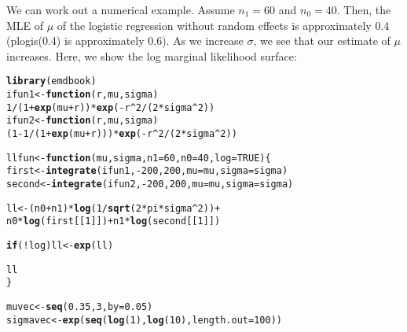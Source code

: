 \documentclass{article}\usepackage[]{graphicx}\usepackage[]{color}
\makeatletter
\newcommand{\hlnum}[1]{\textcolor[rgb]{0.686,0.059,0.569}{#1}}%
\newcommand{\hlopt}[1]{\textcolor[rgb]{0,0,0}{#1}}%
\newcommand{\hlstd}[1]{\textcolor[rgb]{0.345,0.345,0.345}{#1}}%
\newcommand{\hlkwa}[1]{\textcolor[rgb]{0.161,0.373,0.58}{\textbf{#1}}}%
\newcommand{\hlkwb}[1]{\textcolor[rgb]{0.69,0.353,0.396}{#1}}%
\newcommand{\hlkwc}[1]{\textcolor[rgb]{0.333,0.667,0.333}{#1}}%
\newcommand{\hlkwd}[1]{\textcolor[rgb]{0.737,0.353,0.396}{\textbf{#1}}}%
\newenvironment{kframe}{%
 \def\at@end@of@kframe{}%
 \ifinner\ifhmode%
  \def\at@end@of@kframe{\end{minipage}}%
  \begin{minipage}{\columnwidth}%
 \fi\fi%
 \def\FrameCommand##1{\hskip\@totalleftmargin \hskip-\fboxsep
 \colorbox{shadecolor}{##1}\hskip-\fboxsep
     \hskip-\linewidth \hskip-\@totalleftmargin \hskip\columnwidth}%
 \MakeFramed {\advance\hsize-\width
   \@totalleftmargin\z@ \linewidth\hsize
   \@setminipage}}%
 {\par\unskip\endMakeFramed%
 \at@end@of@kframe}
\newenvironment{knitrout}{}{} %
\makeatother
\begin{document}
We can work out a numerical example. Assume $n_1 = 60$ and $n_0=40$. Then, the MLE of $\mu$ of the logistic regression without random effects is approximately 0.4 (plogis(0.4) is approximately 0.6). As we increase $\sigma$, we see that our estimate of $\mu$ increases. Here, we show the log marginal likelihood surface:
\begin{knitrout}
\color{fgcolor}\begin{kframe}
\begin{alltt}
\hlkwd{library}\hlstd{(emdbook)}
\hlstd{ifun1} \hlkwb{<-} \hlkwa{function}\hlstd{(}\hlkwc{r}\hlstd{,} \hlkwc{mu}\hlstd{,} \hlkwc{sigma}\hlstd{)}
        \hlnum{1}\hlopt{/}\hlstd{(}\hlnum{1} \hlopt{+} \hlkwd{exp}\hlstd{(mu} \hlopt{+} \hlstd{r))} \hlopt{*} \hlkwd{exp}\hlstd{(}\hlopt{-}\hlstd{r}\hlopt{^}\hlnum{2}\hlopt{/}\hlstd{(}\hlnum{2} \hlopt{*} \hlstd{sigma}\hlopt{^}\hlnum{2}\hlstd{))}
\hlstd{ifun2} \hlkwb{<-} \hlkwa{function}\hlstd{(}\hlkwc{r}\hlstd{,} \hlkwc{mu}\hlstd{,} \hlkwc{sigma}\hlstd{)}
        \hlstd{(}\hlnum{1} \hlopt{-} \hlnum{1}\hlopt{/}\hlstd{(}\hlnum{1} \hlopt{+} \hlkwd{exp}\hlstd{(mu} \hlopt{+} \hlstd{r)))} \hlopt{*} \hlkwd{exp}\hlstd{(}\hlopt{-}\hlstd{r}\hlopt{^}\hlnum{2}\hlopt{/}\hlstd{(}\hlnum{2} \hlopt{*} \hlstd{sigma}\hlopt{^}\hlnum{2}\hlstd{))}

\hlstd{llfun} \hlkwb{<-} \hlkwa{function}\hlstd{(}\hlkwc{mu}\hlstd{,} \hlkwc{sigma}\hlstd{,} \hlkwc{n1}\hlstd{=}\hlnum{60}\hlstd{,} \hlkwc{n0}\hlstd{=}\hlnum{40}\hlstd{,} \hlkwc{log}\hlstd{=}\hlnum{TRUE}\hlstd{) \{}
        \hlstd{first} \hlkwb{<-} \hlkwd{integrate}\hlstd{(ifun1,} \hlopt{-}\hlnum{200}\hlstd{,} \hlnum{200}\hlstd{,} \hlkwc{mu}\hlstd{=mu,} \hlkwc{sigma}\hlstd{=sigma)}
        \hlstd{second} \hlkwb{<-} \hlkwd{integrate}\hlstd{(ifun2,} \hlopt{-}\hlnum{200}\hlstd{,} \hlnum{200}\hlstd{,} \hlkwc{mu}\hlstd{=mu,} \hlkwc{sigma}\hlstd{=sigma)}

        \hlstd{ll} \hlkwb{<-} \hlstd{(n0} \hlopt{+} \hlstd{n1)} \hlopt{*} \hlkwd{log}\hlstd{(}\hlnum{1}\hlopt{/}\hlkwd{sqrt}\hlstd{(}\hlnum{2} \hlopt{*} \hlstd{pi} \hlopt{*} \hlstd{sigma}\hlopt{^}\hlnum{2}\hlstd{))} \hlopt{+}
                \hlstd{n0} \hlopt{*} \hlkwd{log}\hlstd{(first[[}\hlnum{1}\hlstd{]])} \hlopt{+} \hlstd{n1} \hlopt{*} \hlkwd{log}\hlstd{(second[[}\hlnum{1}\hlstd{]])}

        \hlkwa{if} \hlstd{(}\hlopt{!}\hlstd{log) ll} \hlkwb{<-} \hlkwd{exp}\hlstd{(ll)}

        \hlstd{ll}
\hlstd{\}}

\hlstd{muvec} \hlkwb{<-} \hlkwd{seq}\hlstd{(}\hlnum{0.35}\hlstd{,} \hlnum{3}\hlstd{,} \hlkwc{by}\hlstd{=}\hlnum{0.05}\hlstd{)}
\hlstd{sigmavec} \hlkwb{<-} \hlkwd{exp}\hlstd{(}\hlkwd{seq}\hlstd{(}\hlkwd{log}\hlstd{(}\hlnum{1}\hlstd{),} \hlkwd{log}\hlstd{(}\hlnum{10}\hlstd{),} \hlkwc{length.out}\hlstd{=}\hlnum{100}\hlstd{))}


\end{alltt}
\end{kframe}
\end{knitrout}
\end{document}
